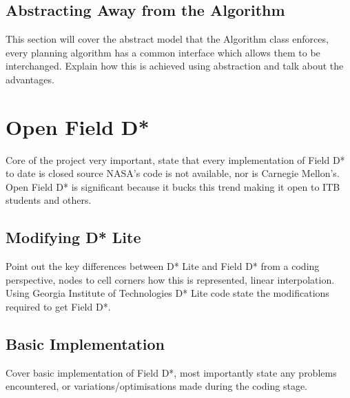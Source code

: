\subsection{Abstracting Away from the Algorithm}
This section will cover the abstract model that the Algorithm class enforces, every planning algorithm has a common interface which allows them to be interchanged. Explain how this is achieved using abstraction and talk about the advantages.


\section{Open Field D*}
Core of the project very important, state that every implementation of Field D* to date is closed source NASA's code is not available, nor is Carnegie Mellon's. Open Field D* is significant because it bucks this trend making it open to ITB students and others.

\subsection{Modifying D* Lite}
Point out the key differences between D* Lite and Field D* from a coding perspective, nodes to cell corners how this is represented, linear interpolation. Using Georgia Institute of Technologies D* Lite code state the modifications required to get Field D*.

\subsection{Basic Implementation}
Cover basic implementation of Field D*, most importantly state any problems encountered, or variations/optimisations made during the coding stage.

